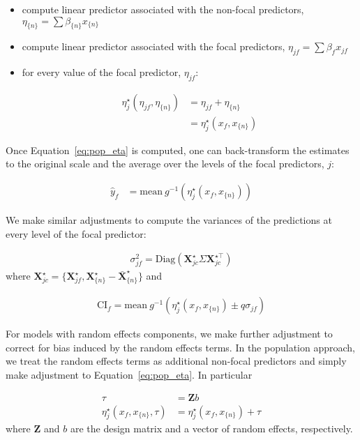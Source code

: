 \documentclass[10pt,letterpaper]{article}
\newcommand{\bX}{{\mathbf X}}
\newcommand{\bZ}{{\mathbf Z}}
\newcommand{\nset}[1]{#1_{\{n\}}}
\begin{document}
\begin{itemize}
\item compute linear predictor associated with the non-focal predictors, $\nset{\eta} = \sum \nset{\beta} \nset{x}$
\item compute linear predictor associated with the focal predictors, $\eta_{jf} = \sum{\beta_f x_{jf}}$
\item for every value of the focal predictor, $\eta_{jf}$:

\begin{align}\label{eq:pop_eta} 
\eta_j^\star(\eta_{jf}, \nset{\eta})  &= \eta_{jf} + \nset{\eta} \nonumber \\
&= \eta_j^\star(x_f, \nset{x})
\end{align}
\end{itemize}

Once Equation~\ref{eq:pop_eta} is computed, one can back-transform the estimates to the original scale and the average over the levels of the focal predictors, $j$:

\begin{align}\label{eq:pop_response} 
\hat{y}_f  &= \textrm{mean} ~ g^{-1} \left(\eta_j^\star(x_f, \nset{x})\right)
\end{align}

We make similar adjustments to compute the variances of the predictions at every level of the focal predictor:

\begin{align}
\sigma_{jf}^2 = \textrm{Diag}(\bX^\star_{jc} \Sigma \bX^{\star\top}_{jc})
\end{align}
where $\bX^{\star}_{jc} = \{\bX_{jf}^\star, \nset{{\bX}^\star} - \nset{{\bar{\bX}}^\star}\}$ and 

\begin{align}
\mathrm{CI}_f = \mathrm{mean} ~ g^{-1} \left(\eta_j^\star(x_f, \nset{x}) \pm q\sigma_{jf}\right)
\end{align}

For models with random effects components, we make further adjustment to correct for bias induced by the random effects terms. In the population approach, we treat the random effects terms as additional non-focal predictors and simply make adjustment to Equation~\ref{eq:pop_eta}. In particular

\begin{align}\label{eq:pop_eta_re} 
\tau &= \bZ b \nonumber \\
\eta_j^\star(x_f, \nset{x}, \tau)  &= \eta_j^\star(x_f, \nset{x}) + \tau
\end{align}
where $\bZ$ and $b$ are the design matrix and a vector of random effects, respectively.
\end{document}
